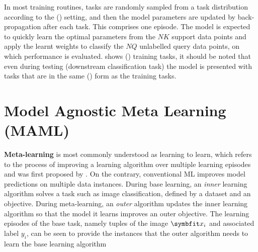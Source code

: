 In most training routines, tasks are randomly sampled from a task distribution according to the () setting, and then the model parameters are updated by back-propagation after each task.
This comprises one episode. The model is expected to quickly learn the optimal parameters from the $NK$ support data points and apply the learnt weights to classify the $NQ$ unlabelled query data points, on which performance is evaluated.
 shows () training tasks, it should be noted that even during testing (downstream classification task) the model is presented with tasks that are in the same () form as the training tasks.

\section{Model Agnostic Meta Learning (MAML)}\label{sec:maml}
\textbf{Meta-learning} is most commonly understood as learning to learn, which refers to the process of improving a learning algorithm over multiple learning episodes and was first proposed by \textcite{schmidhuber:1987:srl}. On the contrary, conventional ML improves model predictions on multiple data instances. 
During base learning, an \emph{inner} learning algorithm solves a task such as image classification, defined by a dataset and an objective. During meta-learning, an \emph{outer} algorithm updates the inner learning algorithm so that the model it learns improves an outer objective.
The learning episodes of the base task, namely tuples of the image $\bfitx_i$ and associated label $y_i$, can be seen to provide the instances that the outer algorithm needs to learn the base learning algorithm


